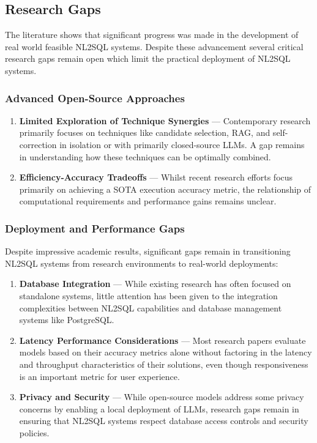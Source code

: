 \subsection{Research Gaps}

The literature shows that significant progress was made in the development of
real world feasible NL2SQL systems. Despite these advancement several critical
research gaps remain open which limit the practical deployment of NL2SQL
systems.

\subsubsection{Advanced Open-Source Approaches}

\begin{enumerate}
    \item \textbf{Limited Exploration of Technique Synergies} — Contemporary
        research primarily focuses on techniques like candidate selection, RAG,
        and self-correction in isolation or with primarily closed-source LLMs.
        A gap remains in understanding how these techniques can be optimally
        combined.
    \item \textbf{Efficiency-Accuracy Tradeoffs} — Whilst recent research
        efforts focus primarily on achieving a SOTA execution accuracy metric,
        the relationship of computational requirements and performance gains
        remains unclear.
\end{enumerate}

\subsubsection{Deployment and Performance Gaps}

Despite impressive academic results, significant gaps remain in transitioning
NL2SQL systems from research environments to real-world deployments:

\begin{enumerate}
    \item \textbf{Database Integration} — While existing research has often
        focused on standalone systems, little attention has been given to the
        integration complexities between NL2SQL capabilities and database
        management systems like PostgreSQL.
    \item \textbf{Latency Performance Considerations} — Most research papers
        evaluate models based on their accuracy metrics alone without factoring
        in the latency and throughput characteristics of their solutions,
        even though responsiveness is an important metric for user experience.
    \item \textbf{Privacy and Security} — While open-source models address some
        privacy concerns by enabling a local deployment of LLMs, research gaps
        remain in ensuring that NL2SQL systems respect database access controls
        and security policies.
\end{enumerate}

